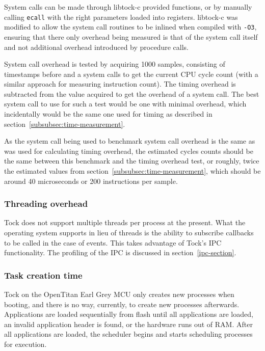 \documentclass{article}
\begin{document}
System calls can be made through libtock-c provided functions, or by manually calling \texttt{ecall} with the right parameters loaded into registers. libtock-c was modified to allow the system call routines to be inlined when compiled with \texttt{-O3}, ensuring that there only overhead being measured is that of the system call itself and not additional overhead introduced by procedure calls.

System call overhead is tested by acquiring 1000 samples, consisting of timestamps before and a system calls to get the current CPU cycle count (with a similar approach for measuring instruction count). The timing overhead is subtracted from the value acquired to get the overhead of a system call. The best system call to use for such a test would be one with minimal overhead, which incidentally would be the same one used for timing as described in section~\ref{subsubsec:time-measurement}.

As the system call being used to benchmark system call overhead is the same as was used for calculating timing overhead, the estimated cycles counts should be the same between this benchmark and the timing overhead test, or roughly, twice the estimated values from section~\ref{subsubsec:time-measurement}, which should be around 40 microseconds or 200 instructions per sample.

\subsubsection{Threading overhead}

Tock does not support multiple threads per process at the present. What the operating system supports in lieu of threads is the ability to subscribe callbacks to be called in the case of events. This takes advantage of Tock's IPC functionality. The profiling of the IPC is discussed in section~\ref{ipc-section}.

\subsubsection{Task creation time}

Tock on the OpenTitan Earl Grey MCU only creates new processes when booting, and there is no way, currently, to create new processes afterwards. Applications are loaded sequentially from flash until all applications are loaded, an invalid application header is found, or the hardware runs out of RAM. After all applications are loaded, the scheduler begins and starts scheduling processes for execution.
\end{document}

